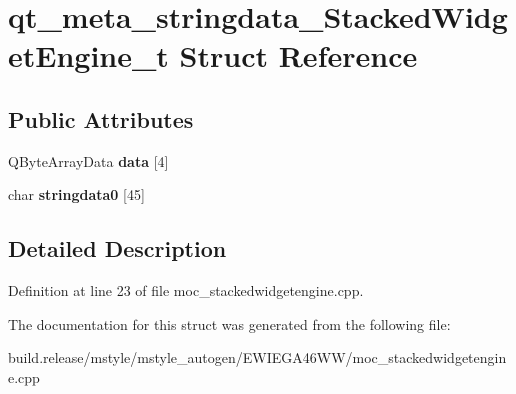 \hypertarget{structqt__meta__stringdata___stacked_widget_engine__t}{}\section{qt\+\_\+meta\+\_\+stringdata\+\_\+\+Stacked\+Widget\+Engine\+\_\+t Struct Reference}
\label{structqt__meta__stringdata___stacked_widget_engine__t}
\subsection*{Public Attributes}
\begin{DoxyCompactItemize}
\item 
\mbox{\label{structqt__meta__stringdata___stacked_widget_engine__t_a4d0e1552ad0f2ac89788d6a2296da48b}} 
Q\+Byte\+Array\+Data {\bfseries data} \mbox{[}4\mbox{]}
\item 
\mbox{\label{structqt__meta__stringdata___stacked_widget_engine__t_a142ea1c4d5ef42b5cd4df43787158698}} 
char {\bfseries stringdata0} \mbox{[}45\mbox{]}
\end{DoxyCompactItemize}


\subsection{Detailed Description}


Definition at line 23 of file moc\+\_\+stackedwidgetengine.\+cpp.



The documentation for this struct was generated from the following file\+:\begin{DoxyCompactItemize}
\item 
build.\+release/mstyle/mstyle\+\_\+autogen/\+E\+W\+I\+E\+G\+A46\+W\+W/moc\+\_\+stackedwidgetengine.\+cpp\end{DoxyCompactItemize}
